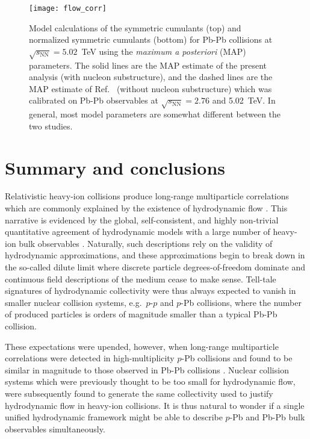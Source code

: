 \documentclass[aps,prc,reprint,amsmath,nofootinbib]{revtex4-1}
\newcommand{\sqrts}{\sqrt{s_\mathrm{NN}}}
\begin{document}
\begin{figure}
  \texttt{[image: flow\_corr]}
  \caption{
    \label{fig:flow_corr}
    Model calculations of the symmetric cumulants (top) and normalized symmetric cumulants (bottom) for Pb-Pb collisions at $\sqrts=5.02$~TeV using the \emph{maximum a posteriori} (MAP) parameters.
    The solid lines are the MAP estimate of the present analysis (with nucleon substructure), and the dashed lines are the MAP estimate of Ref.~\cite{Bernhard:2018hnz} (without nucleon substructure) which was calibrated on Pb-Pb observables at $\sqrts=2.76$ and 5.02~TeV.
    In general, most model parameters are somewhat different between the two studies.
  }
\end{figure}


\section{Summary and conclusions}
\label{sec:summary}

Relativistic heavy-ion collisions produce long-range multiparticle correlations which are commonly explained by the existence of hydrodynamic flow \cite{deSouza:2015ena}.
This narrative is evidenced by the global, self-consistent, and highly non-trivial quantitative agreement of hydrodynamic models with a large number of heavy-ion bulk observables \cite{Niemi:2015qia, Bernhard:2016tnd, Gale:2012rq}.
Naturally, such descriptions rely on the validity of hydrodynamic approximations, and these approximations begin to break down in the so-called dilute limit where discrete particle degrees-of-freedom dominate and continuous field descriptions of the medium cease to make sense.
Tell-tale signatures of hydrodynamic collectivity were thus always expected to vanish in smaller nuclear collision systems, e.g.\ $p$-$p$ and $p$-Pb collisions, where the number of produced particles is orders of magnitude smaller than a typical Pb-Pb collision.

These expectations were upended, however, when long-range multiparticle correlations were detected in high-multiplicity $p$-Pb collisions and found to be similar in magnitude to those observed in Pb-Pb collisions \cite{CMS:2012qk, Abelev:2012ola, Aad:2012gla}.
Nuclear collision systems which were previously thought to be too small for hydrodynamic flow, were subsequently found to generate the same collectivity used to justify hydrodynamic flow in heavy-ion collisions.
It is thus natural to wonder if a single unified hydrodynamic framework might be able to describe $p$-Pb and Pb-Pb bulk observables simultaneously.
\end{document}
